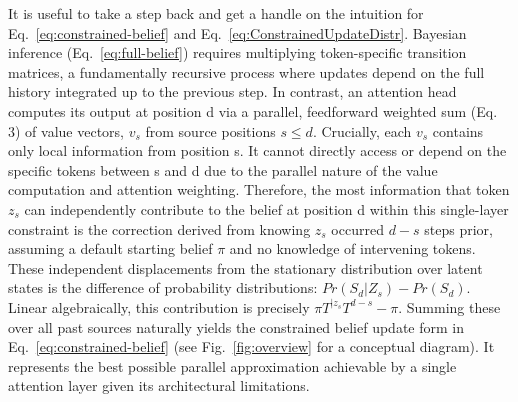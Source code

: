\documentclass{article}
\theoremstyle{plain}
\theoremstyle{definition}
\theoremstyle{remark}
\newcommand{\stationary}{\boldsymbol{\pi}}
\begin{document}
It is useful to take a step back and get a handle on the intuition for Eq.~\eqref{eq:constrained-belief} and Eq.~\eqref{eq:ConstrainedUpdateDistr}.  Bayesian inference (Eq.~\eqref{eq:full-belief}) requires multiplying token-specific transition matrices, a fundamentally recursive process where updates depend on the full history integrated up to the previous step.
In contrast, an attention head computes its output at position d via a parallel, feedforward weighted sum (Eq. 3) of value vectors, $v_s$ from source positions $s\le d$.
Crucially, each $v_s$ contains only local information from position s. It cannot directly access or depend on the specific tokens between s and d due to the parallel nature of the value computation and attention weighting.
Therefore, the most information that token $z_s$ can independently contribute to the belief at position d within this single-layer constraint is the correction derived from knowing $z_s$ occurred $d-s$ steps prior, assuming a default starting belief $\pi$ and no knowledge of intervening tokens. These independent displacements from the stationary distribution over latent states is the difference of probability distributions: $Pr(S_d|Z_s)-Pr(S_d)$. Linear algebraically, this contribution is precisely $\pi T^{|z_s} T^{d-s} - \pi$.
Summing these over all past sources naturally yields the constrained belief update form in Eq.~\eqref{eq:constrained-belief} (see Fig.~\ref{fig:overview} for a conceptual diagram). It represents the best possible parallel approximation achievable by a single attention layer given its architectural limitations.
%

\end{document}
